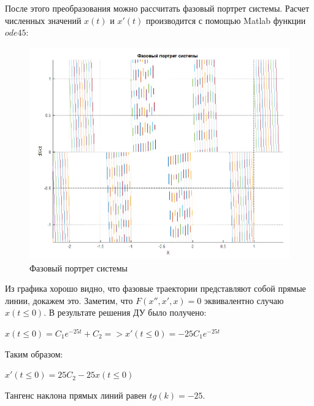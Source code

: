 \documentclass[14pt,a4paper,report]{report}
\begin{document}
После этого преобразования можно рассчитать фазовый портрет системы. Расчет численных значений $x(t)$ и $x'(t)$ производится с помощью Matlab функции $ode45$:




\begin{figure}[h!]
	\centering
	\includegraphics[scale = 0.43]{images/odeneg.png}
	\caption{Фазовый портрет системы}
	\label{image:9}
\end{figure}

Из графика хорошо видно, что фазовые траектории представляют собой прямые линии, докажем это. Заметим, что $F(x'',x',x)=0$ эквивалентно случаю $x(t\leq0)$. В результате решения ДУ было получено:

$x(t\leq0)=C_1e^{-25t}+C_2 => x'(t\leq0)=-25C_1e^{-25t}$

Таким образом:

$x'(t\leq0)=25C_2-25x(t\leq0)$

Тангенс наклона прямых линий равен $tg(k)=-25$.

\end{document}
